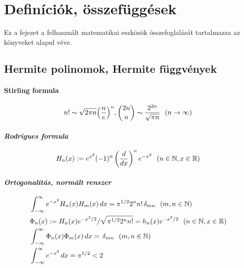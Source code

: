 \documentclass[oneside,titlepage,12pt,a4paper]{report}
\begin{document}
\chapter{Definíciók, összefüggések}

Ez a fejezet a felhaszn\'alt matematikai eszk\"oz\"ok \"osszefoglal\'as\'at tartalmazza az \cite{szego, szoke} k\"onyveket alapul v\'eve.

\section {Hermite  polinomok, Hermite f\"uggv\'enyek}
\subsubsection{Stirling  formula}
\begin{equation*}
n!\thicksim \sqrt {2\pi n}\Big(\frac ne\Big)^n,  \binom {2n} n\thicksim \frac {2^{2n}}{\sqrt{\pi n}}\ \ (
n\to\infty)
\end{equation*}

\subsubsection{\it  Rodrigues formula}
\begin{equation}
\begin{split}
&H_n(x):=e^{x^2}(-1)^n\left(\frac d{dx}\right)^n e^{-x^2}\ \ (n\in\Bbb N, x\in\Bbb R)\\
\end{split}
\end{equation}

\subsubsection{\it  Ortogonalit\'as, norm\'alt renszer}
\begin{equation}
\begin{split}
&\int_{-\infty}^\infty e^{-x^2}H_n(x)H_m(x)\, dx=\pi^{1/2}2^n n!\, \delta_{mn}\ \ (m,n\in\Bbb N)\\
&\Phi_n(x):=H_n(x)e^{-x^2/2}/\sqrt{\pi^{1/2}2^n n!}=h_n(x)e^{-x^2/2} \ \ (n\in\Bbb N, x\in\Bbb R)\\
&\int_{-\infty}^\infty \Phi_n(x)\Phi_m(x)\, dx=\, \delta_{mn}\ \ (m,n\in\Bbb N)\\
&\int_{-\infty}^\infty e^{-x^2}\, dx=\pi^{1/2}<2
\end{split}
\end{equation}
\end{document}
